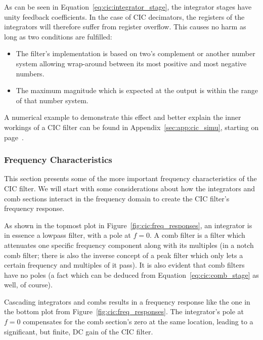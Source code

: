 As  can  be  seen in  Equation~\ref{eq:cic:integrator_stage},  the  integrator
stages have  unity feedback coefficients. In  the case of CIC  decimators, the
registers of  the integrators  will therefore  suffer from  register overflow.
This causes no harm as long as two conditions are fulfilled:
\begin{itemize}\tightlist
    \item
        The filter's  implementation is based  on two's complement  or another
        number system allowing wrap-around between  its most positive and most
        negative numbers.
    \item
        The maximum  magnitude which is expected  at the output is  within the
        range of that number system.
\end{itemize}

A numerical  example to demonstrate this  effect and better explain  the inner
workings  of a  CIC filter  can be  found in  Appendix~\ref{sec:app:cic_simu},
starting on page~\pageref{sec:app:cic_simu}.


\subsubsection{Frequency Characteristics}
\label{subsubsec:cic:frequency_characteristics}

This section presents some of  the more important frequency characteristics of
the  CIC  filter. We  will  start  with  some  considerations  about  how  the
integrators and comb  sections interact in the frequency domain  to create the
CIC filter's frequency response.

As  shown  in  the  topmost plot  in  Figure~\ref{fig:cic:freq_responses},  an
integrator is  in essence a lowpass  filter, with a pole  at $f = 0$.   A comb
filter is  a filter  which attenuates one  specific frequency  component along
with its multiples (in a notch comb  filter; there is also the inverse concept
of a  peak filter  which only  lets a  certain frequency  and multiples  of it
pass).  It is also  evident that comb filters have no poles  (a fact which can
be deduced from Equation~\ref{eq:cic:comb_stage} as well, of course).

Cascading integrators and  combs results in a frequency response  like the one
in the bottom  plot from Figure~\ref{fig:cic:freq_responses}. The integrator's
pole at $f = 0$ compensates for  the comb section's zero at the same location,
leading to a significant, but finite, DC gain of the CIC filter.

